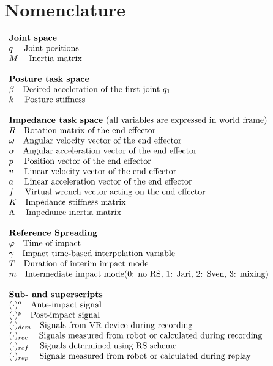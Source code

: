 \documentclass[11pt]{report}
\numberwithin{equation}{section}        %
\numberwithin{figure}{section}          %
\numberwithin{table}{section}           %
\begin{document}
\section*{Nomenclature}

$\begin{array}{l}
\text{\textbf{Joint space}}\\
q \;\quad \text{Joint positions}\\
M \;\quad \text{Inertia matrix}\\
\\
\text{\textbf{Posture task space}}\\
\beta \quad \text{Desired acceleration of the first joint } q_1\\
k \;\quad \text{Posture stiffness}\\

\\
\text{\textbf{Impedance task space} (all variables are expressed in world frame)}\\
R \quad \text{Rotation matrix of the end effector}\\
\omega \quad \text{Angular velocity vector of the end effector}\\
\alpha \quad \text{Angular acceleration vector of the end effector}\\
p \;\quad \text{Position vector of the end effector}\\
v \;\quad \text{Linear velocity vector of the end effector}\\
a \;\quad \text{Linear acceleration vector of the end effector}\\
f \;\quad \text{Virtual wrench vector acting on the end effector}\\
K \quad \text{Impedance stiffness matrix} \\
\Lambda \;\quad \text{Impedance inertia matrix} \\
\\

\text{\textbf{Reference Spreading}}\\
\varphi  \quad \text{Time of impact}\\
\gamma  \quad \text{Impact time-based interpolation variable}\\
T  \quad \text{Duration of interim impact mode}\\
m \quad \text{Intermediate impact mode(0: no RS, 1: Jari, 2: Sven, 3: mixing)}\\\\
\text{\textbf{Sub- and superscripts}}\\
(\cdot)^{a} \quad \text{Ante-impact signal}\\
(\cdot)^{p} \quad \text{Post-impact signal}\\
(\cdot)_{dem} \quad \text{Signals from VR device during recording}\\
(\cdot)_{rec} \;\quad \text{Signals measured from robot or calculated during recording}\\
(\cdot)_{ref} \;\quad \text{Signals determined using RS scheme}\\
(\cdot)_{rep} \;\quad \text{Signals measured from robot or calculated during replay}\\
\end{array}$
\newpage
\end{document}
